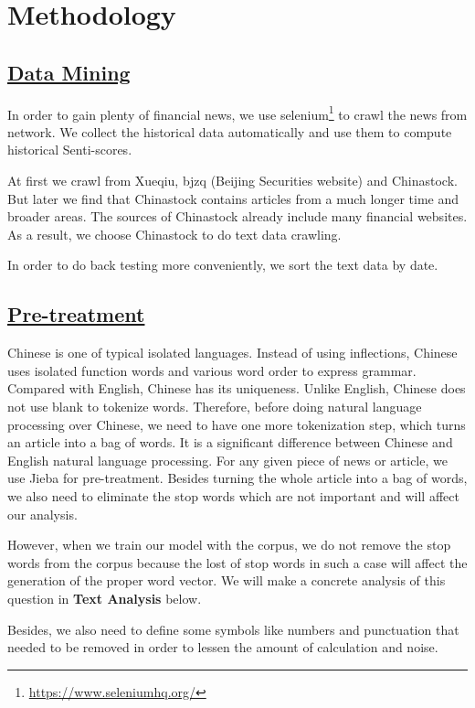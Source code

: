 \documentclass[10pt, conference, compsocconf]{IEEEtran}
\begin{document}
\section{Methodology}
\subsection{\underline{Data Mining}}

In order to gain plenty of financial news, we use selenium\footnote{\href{https://www.seleniumhq.org/}{https://www.seleniumhq.org/}} to crawl the news from network. We collect the historical data automatically and use them to compute historical Senti-scores.

At first we crawl from Xueqiu, bjzq (Beijing Securities website) and Chinastock. But later we find that Chinastock contains articles from a much longer time and broader areas. The sources of Chinastock already include many financial websites. As a result, we choose Chinastock to do text data crawling.

In order to do back testing more conveniently, we sort the text data by date.

\subsection{\underline{Pre-treatment}}

Chinese is one of typical isolated languages. Instead of using inflections, Chinese uses isolated function words and various word order to express grammar. Compared with English, Chinese has its uniqueness. Unlike English, Chinese does not use blank to tokenize words. Therefore, before doing natural language processing over Chinese, we need to have one more tokenization step, which turns an article into a bag of words. It is a significant difference between Chinese and English natural language processing. For any given piece of news or article, we use Jieba for pre-treatment. Besides turning the whole article into a bag of words, we also need to eliminate the stop words which are not important and will affect our analysis.

However, when we train our model with the corpus, we do not remove the stop words from the corpus because the lost of stop words in such a case will affect the generation of the proper word vector. We will make a concrete analysis of this question in \textbf{Text Analysis} below.

Besides, we also need to define some symbols like numbers and punctuation that needed to be removed in order to lessen the amount of calculation and noise.
\end{document}
